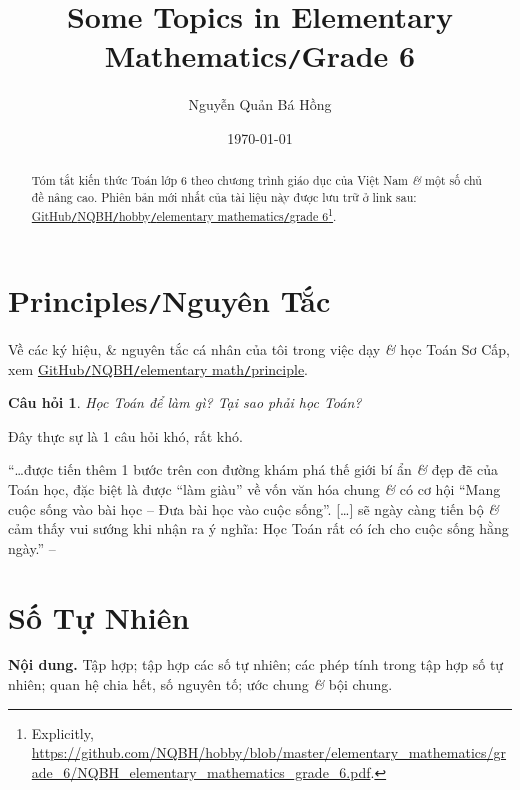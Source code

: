 \documentclass{article}
\title{Some Topics in Elementary Mathematics\texttt{/}Grade 6}
\author{Nguyễn Quản Bá Hồng}
\date{\today}
\numberwithin{equation}{section}
\newtheorem{question}{Câu hỏi}[section]
\begin{document}
\maketitle
\begin{abstract}
	Tóm tắt kiến thức Toán lớp 6 theo chương trình giáo dục của Việt Nam \textit{\&} một số chủ đề nâng cao. Phiên bản mới nhất của tài liệu này được lưu trữ ở link sau: \href{https://github.com/NQBH/hobby/blob/master/elementary_mathematics/grade_6/NQBH_elementary_mathematics_grade_6.pdf}{GitHub\texttt{/}NQBH\texttt{/}hobby\texttt{/}elementary mathematics\texttt{/}grade 6}\footnote{Explicitly, \url{https://github.com/NQBH/hobby/blob/master/elementary_mathematics/grade_6/NQBH_elementary_mathematics_grade_6.pdf}.}.
\end{abstract}
\setcounter{secnumdepth}{4}
\setcounter{tocdepth}{3}
\tableofcontents


\section*{Principles\texttt{/}Nguyên Tắc}
Về các ký hiệu, \& nguyên tắc cá nhân của tôi trong việc dạy \textit{\&} học Toán Sơ Cấp, xem \href{https://github.com/NQBH/hobby/blob/master/elementary_math/principle/NQBH_elementary_mathematics_principle.pdf}{GitHub\texttt{/}NQBH\texttt{/}elementary math\texttt{/}principle}.

\begin{question}
	Học Toán để làm gì? Tại sao phải học Toán?
\end{question}
Đây thực sự là 1 câu hỏi khó, rất khó.

``\ldots được tiến thêm 1 bước trên con đường khám phá thế giới bí ẩn \textit{\&} đẹp đẽ của Toán học, đặc biệt là được ``làm giàu'' về vốn văn hóa chung \textit{\&} có cơ hội ``Mang cuộc sống vào bài học -- Đưa bài học vào cuộc sống''. [\ldots] sẽ ngày càng tiến bộ \textit{\&} cảm thấy vui sướng khi nhận ra ý nghĩa: Học Toán rất có ích cho cuộc sống hằng ngày.'' -- \cite[p. 1]{Thai_Anh_Dat_Ha_Loan_Nam_Quang_Toan_6_tap_1}


\section{Số Tự Nhiên}
\textbf{Nội dung.} Tập hợp; tập hợp các số tự nhiên; các phép tính trong tập hợp số tự nhiên; quan hệ chia hết, số nguyên tố; ước chung \textit{\&} bội chung.
\end{document}
